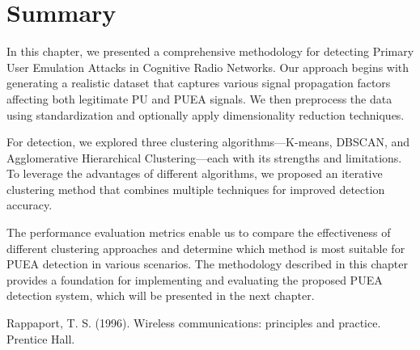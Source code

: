 \section{Summary}
In this chapter, we presented a comprehensive methodology for detecting Primary User Emulation Attacks in Cognitive Radio Networks. Our approach begins with generating a realistic dataset that captures various signal propagation factors affecting both legitimate PU and PUEA signals. We then preprocess the data using standardization and optionally apply dimensionality reduction techniques.

For detection, we explored three clustering algorithms—K-means, DBSCAN, and Agglomerative Hierarchical Clustering—each with its strengths and limitations. To leverage the advantages of different algorithms, we proposed an iterative clustering method that combines multiple techniques for improved detection accuracy.

The performance evaluation metrics enable us to compare the effectiveness of different clustering approaches and determine which method is most suitable for PUEA detection in various scenarios. The methodology described in this chapter provides a foundation for implementing and evaluating the proposed PUEA detection system, which will be presented in the next chapter.

\begin{thebibliography}{99}
 Rappaport, T. S. (1996). Wireless communications: principles and practice. Prentice Hall.
\end{thebibliography}
